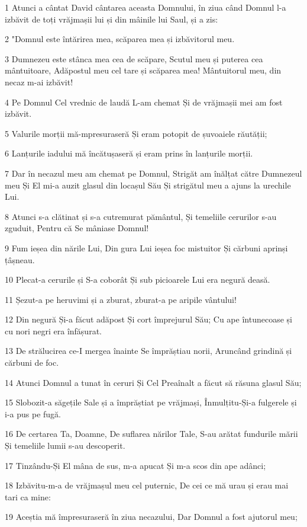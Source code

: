 \par 1 Atunci a cântat David cântarea aceasta Domnului, în ziua când Domnul l-a izbăvit de toți vrăjmașii lui și din mâinile lui Saul, și a zis:
\par 2 "Domnul este întărirea mea, scăparea mea și izbăvitorul meu.
\par 3 Dumnezeu este stânca mea cea de scăpare, Scutul meu și puterea cea mântuitoare, Adăpostul meu cel tare și scăparea mea! Mântuitorul meu, din necaz m-ai izbăvit!
\par 4 Pe Domnul Cel vrednic de laudă L-am chemat Și de vrăjmașii mei am fost izbăvit.
\par 5 Valurile morții mă-mpresuraseră Și eram potopit de șuvoaiele răutății;
\par 6 Lanțurile iadului mă încătușaseră și eram prins în lanțurile morții.
\par 7 Dar în necazul meu am chemat pe Domnul, Strigăt am înălțat către Dumnezeul meu Și El mi-a auzit glasul din locașul Său Și strigătul meu a ajuns la urechile Lui.
\par 8 Atunci s-a clătinat și s-a cutremurat pământul, Și temeliile cerurilor s-au zguduit, Pentru că Se mâniase Domnul!
\par 9 Fum ieșea din nările Lui, Din gura Lui ieșea foc mistuitor Și cărbuni aprinși țâșneau.
\par 10 Plecat-a cerurile și S-a coborât Și sub picioarele Lui era negură deasă.
\par 11 Șezut-a pe heruvimi și a zburat, zburat-a pe aripile vântului!
\par 12 Din negură Și-a făcut adăpost Și cort împrejurul Său; Cu ape întunecoase și cu nori negri era înfășurat.
\par 13 De strălucirea ce-I mergea înainte Se împrăștiau norii, Aruncând grindină și cărbuni de foc.
\par 14 Atunci Domnul a tunat în ceruri Și Cel Preaînalt a făcut să răsuna glasul Său;
\par 15 Slobozit-a săgețile Sale și a împrăștiat pe vrăjmași, Înmulțitu-Și-a fulgerele și i-a pus pe fugă.
\par 16 De certarea Ta, Doamne, De suflarea nărilor Tale, S-au arătat fundurile mării Și temeliile lumii s-au descoperit.
\par 17 Tinzându-Și El mâna de sus, m-a apucat Și m-a scos din ape adânci;
\par 18 Izbăvitu-m-a de vrăjmașul meu cel puternic, De cei ce mă urau și erau mai tari ca mine:
\par 19 Aceștia mă împresuraseră în ziua necazului, Dar Domnul a fost ajutorul meu;
